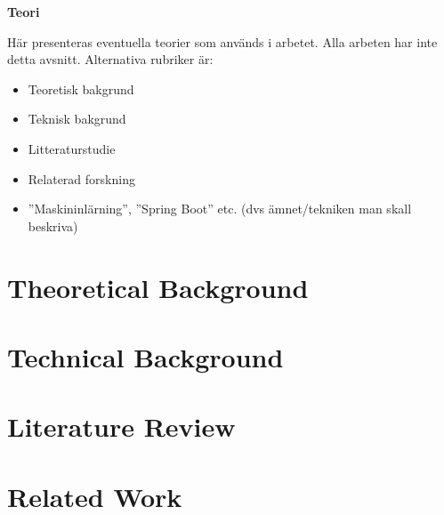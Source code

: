 \begin{mdframed}[innertopmargin=10pt, innerbottommargin=10pt, innerleftmargin=10pt, innerrightmargin=10pt, skipabove=10pt, skipbelow=10pt, roundcorner=10pt]
    \textbf{Teori}
    
    Här presenteras eventuella teorier som används i arbetet. Alla arbeten har inte detta avsnitt. Alternativa rubriker är:
    \begin{itemize}
        \item Teoretisk bakgrund
        \item Teknisk bakgrund
        \item Litteraturstudie
        \item Relaterad forskning
        \item ”Maskininlärning”, ”Spring Boot” etc. (dvs ämnet/tekniken man skall beskriva)
    \end{itemize}
    \end{mdframed}

\section{Theoretical Background}
\label{sec:theoreticalbackground}


\section{Technical Background}
\label{sec:technicalbackground}
%

\section{Literature Review}
\label{sec:literaturereview}
%

\section{Related Work}
\label{sec:relatedwork}
